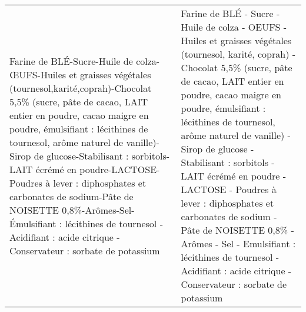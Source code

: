 \begin{tabular}{p{7cm}p{7cm}}
                                                                                                                                                                                                                                                                                                                                                                                                                                                                                                                                                                                                                                                                                                                                                                                                                                                                                                                                                                                                                                                                                                                                                                                        Farine de BLÉ-Sucre-Huile de colza-ŒUFS-Huiles et graisses végétales (tournesol,karité,coprah)-Chocolat 5,5\% (sucre, pâte de cacao, LAIT entier en poudre, cacao maigre en poudre, émulsifiant : lécithines de tournesol, arôme naturel de vanille)-Sirop de glucose-Stabilisant : sorbitols-LAIT écrémé en poudre-LACTOSE-Poudres à lever : diphosphates et carbonates de sodium-Pâte de NOISETTE 0,8\%-Arômes-Sel-Émulsifiant : lécithines de tournesol - Acidifiant : acide citrique - Conservateur : sorbate de potassium &  Farine de BLÉ - Sucre - Huile de colza - OEUFS - Huiles et graisses végétales (tournesol, karité, coprah) - Chocolat 5,5\% (sucre, pâte de cacao, LAIT entier en poudre, cacao maigre en poudre, émulsifiant : lécithines de tournesol, arôme naturel de vanille) - Sirop de glucose - Stabilisant : sorbitols - LAIT écrémé en poudre - LACTOSE - Poudres à lever : diphosphates et carbonates de sodium - Pâte de NOISETTE 0,8\% - Arômes - Sel - Emulsifiant : lécithines de tournesol - Acidifiant : acide citrique - Conservateur : sorbate de potassium \\

\end{tabular}
